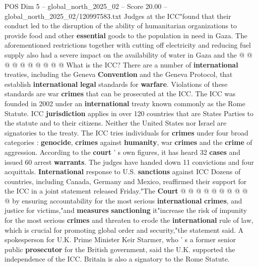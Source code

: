 \begin{textsample}{POS Dim 5 – global\_north\_2025\_02 – Score 20.00 – global\_north\_2025\_02/120997583.txt}
Judges at the ICC"found that their conduct led to the disruption of the ability of humanitarian organizations to provide food and other \textbf{essential} goods to the population in need in Gaza.
The aforementioned restrictions together with cutting off electricity and reducing fuel supply also had a severe impact on the availability of water in Gaza and the @ @ @ @ @ @ @ @ @ @ What is the ICC?
There are a number of \textbf{international} treaties, including the Geneva \textbf{Convention} and the Geneva Protocol, that establish \textbf{international} \textbf{legal} standards for \textbf{warfare}.
Violations of these standards are war \textbf{crimes} that can be prosecuted at the ICC.
The ICC was founded in 2002 under an \textbf{international} treaty known commonly as the Rome Statute.
ICC \textbf{jurisdiction} applies in over 120 countries that are States Parties to the statute and to their citizens.
Neither the United States nor Israel are signatories to the treaty.
The ICC tries individuals for \textbf{crimes} under four broad categories : \textbf{genocide}, \textbf{crimes} against \textbf{humanity}, war \textbf{crimes} and the \textbf{crime} of aggression.
According to the \textbf{court} ' s own figures, it has heard 32 \textbf{cases} and issued 60 arrest \textbf{warrants}.
The judges have handed down 11 convictions and four acquittals. \textbf{International} response to U.S. \textbf{sanctions} against ICC Dozens of countries, including Canada, Germany and Mexico, reaffirmed their support for the ICC in a joint statement released Friday."The \textbf{Court} @ @ @ @ @ @ @ @ @ @ by ensuring accountability for the most serious \textbf{international} \textbf{crimes}, and justice for victims,"and \textbf{measures} \textbf{sanctioning} it"increase the risk of impunity for the most serious \textbf{crimes} and threaten to erode the \textbf{international} rule of law, which is crucial for promoting global order and security,"the statement said.
A spokesperson for U.K.
Prime Minister Keir Starmer, who ' s a former senior public \textbf{prosecutor} for the British government, said the U.K. supported the independence of the ICC.
Britain is also a signatory to the Rome Statute.

\end{textsample}
